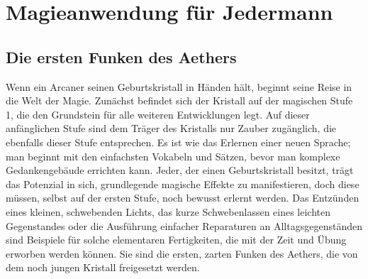 \documentclass[10pt,a4paper,twocolumn,openany]{book}
\begin{document}
%
%
%
%
%
%
%
%



\chapter{Magieanwendung für Jedermann}

\section{Die ersten Funken des Aethers}

Wenn ein Arcaner seinen Geburtskristall in Händen hält, beginnt seine Reise in die Welt der Magie. Zunächst befindet sich der Kristall auf der magischen Stufe 1, die den Grundstein für alle weiteren Entwicklungen legt. Auf dieser anfänglichen Stufe sind dem Träger des Kristalls nur Zauber zugänglich, die ebenfalls dieser Stufe entsprechen. Es ist wie das Erlernen einer neuen Sprache; man beginnt mit den einfachsten Vokabeln und Sätzen, bevor man komplexe Gedankengebäude errichten kann. Jeder, der einen Geburtskristall besitzt, trägt das Potenzial in sich, grundlegende magische Effekte zu manifestieren, doch diese müssen, selbst auf der ersten Stufe, noch bewusst erlernt werden. Das Entzünden eines kleinen, schwebenden Lichts, das kurze Schwebenlassen eines leichten Gegenstandes oder die Ausführung einfacher Reparaturen an Alltagsgegenständen sind Beispiele für solche elementaren Fertigkeiten, die mit der Zeit und Übung erworben werden können. Sie sind die ersten, zarten Funken des Aethers, die von dem noch jungen Kristall freigesetzt werden.
\end{document}
